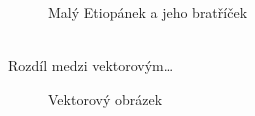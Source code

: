 \documentclass[11pt, a4paper]{article}
\begin{document}
\begin{figure}[h]
{}
\caption{Malý Etiopánek a jeho bratříček} \label{pic1}
\end{figure}
\pagebreak
\\Rozdíl medzi vektorovým\dots
\begin{figure}[h]
    \centering
    \caption{Vektorový obrázek}
    \label{pic2}
\end{figure}
\end{document}
